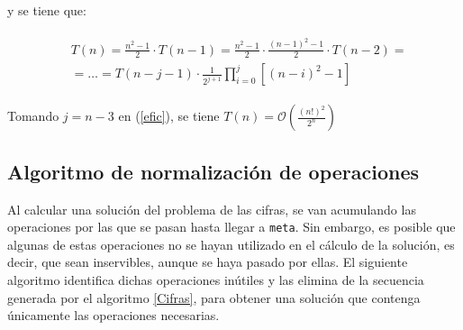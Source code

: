 \documentclass[a4paper,10pt]{scrartcl}
\def\C++#1{\texttt{#1}}
\begin{document}
\begin{itemize}
    y se tiene que:
    
    \begin{gather}
    \begin{split}
     \label{efic}
    &T(n)=\frac{n^2-1}{2}\cdot T(n-1)= \frac{n^2-1}{2}\cdot\frac{(n-1)^2-1}{2}
    \cdot T(n-2)=\\ \nonumber
    &=\ldots=T(n-j-1)\cdot\frac{1}{2^{j+1}}\prod_{i=0}^j[(n-i)^2-1]
    \end{split}
    \end{gather}
    
    Tomando $j=n-3$ en (\ref{efic}), se tiene $T(n)=
    \mathcal{O}\left(\frac{(n!)^2}{2^n}\right)$
   \end{itemize}

   
\subsection{Algoritmo de normalización de operaciones}
   Al calcular una solución del problema de las cifras, se van acumulando las operaciones
   por las que se pasan hasta llegar a \C++{meta}. Sin embargo, es posible que algunas de
   estas operaciones no se hayan utilizado en el cálculo de la solución, es decir, que sean
   inservibles, aunque se haya pasado por ellas. El siguiente algoritmo identifica dichas
   operaciones inútiles y las elimina de la secuencia generada por el algoritmo \ref{Cifras},
   para obtener una solución que contenga únicamente las operaciones necesarias.


   
\end{document}
